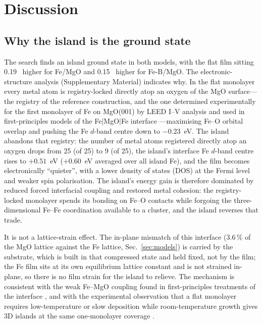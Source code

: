 \section{Discussion}
\label{sec:discussion}

\subsection{Why the island is the ground state}
\label{sec:island-ground}

The search finds an island ground state in both models, with the flat film sitting 0.19~\eVA{} higher
for Fe/MgO and 0.15~\eVA{} higher for Fe-B/MgO. The electronic-structure analysis (Supplementary
Material) indicates why. In the flat monolayer every metal atom is registry-locked directly atop an
oxygen of the MgO surface---the registry of the reference construction, and the one determined
experimentally for the first monolayer of Fe on MgO(001) by LEED I--V analysis \cite{urano1988} and
used in first-principles models of the Fe$|$MgO$|$Fe interface \cite{butler2001}---maximising Fe--O
orbital overlap and pushing the Fe $d$-band centre down to $-0.23$~eV. The island abandons that
registry: the number of metal atoms registered directly atop an oxygen drops from 25 (of 25) to 9 (of
25), the island's interface Fe $d$-band centre rises to $+0.51$~eV ($+0.60$~eV averaged over all
island Fe), and the film becomes electronically ``quieter'', with a lower density of states (DOS) at
the Fermi level and weaker spin polarisation. The island's energy gain is therefore dominated by reduced forced
interfacial coupling and restored metal cohesion: the registry-locked monolayer spends its bonding
on Fe--O contacts while forgoing the three-dimensional Fe--Fe coordination available to a cluster,
and the island reverses that trade.

It is not a lattice-strain effect. The in-plane mismatch of this interface (3.6\,\% of the
MgO lattice against the Fe lattice, Sec.~\ref{sec:models}) is carried by the substrate,
which is built in that compressed state and held fixed, not by the film; the Fe film sits at its own
equilibrium lattice constant and is not strained in-plane, so there is no film strain for the island
to relieve. The mechanism is consistent with the weak Fe--MgO coupling found in first-principles
treatments of the interface \cite{butler2001}, and with the experimental observation that a flat
monolayer requires low-temperature or slow deposition while room-temperature growth gives 3D islands
at the same one-monolayer coverage \cite{fahsold2000,torelli2009,reitinger2007}.

